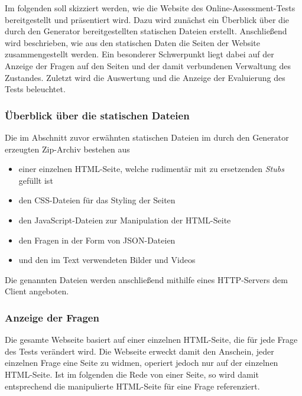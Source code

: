 \label{Jena}

Im folgenden soll skizziert werden, wie die Website des Online-Assessment-Tests bereitgestellt und präsentiert wird. Dazu wird zunächst ein Überblick über die durch den Generator bereitgestellten statischen Dateien erstellt. Anschließend wird beschrieben, wie aus den statischen Daten die Seiten der Website zusammengestellt werden. Ein besonderer Schwerpunkt liegt dabei auf der Anzeige der Fragen auf den Seiten und der damit verbundenen Verwaltung des Zustandes. Zuletzt wird die Auswertung und die Anzeige der Evaluierung des Tests beleuchtet.

\subsubsection{Überblick über die statischen Dateien}

Die im Abschnitt zuvor erwähnten statischen Dateien im durch den Generator erzeugten Zip-Archiv bestehen aus

\begin{itemize}
\item einer einzelnen HTML-Seite, welche rudimentär mit zu ersetzenden \textit{Stubs} gefüllt ist

\item den CSS-Dateien für das Styling der Seiten

\item den JavaScript-Dateien zur Manipulation der HTML-Seite 

\item den Fragen in der Form von JSON-Dateien

\item und den im Text verwendeten Bilder und Videos
\end{itemize}

Die genannten Dateien werden anschließend mithilfe eines HTTP-Servers dem Client angeboten. 

\subsubsection{Anzeige der Fragen}

Die gesamte Webseite basiert auf einer einzelnen HTML-Seite, die für jede Frage des Tests verändert wird. Die Webseite erweckt damit den Anschein, jeder einzelnen Frage eine Seite zu widmen, operiert jedoch nur auf der einzelnen HTML-Seite. Ist im folgenden die Rede von einer Seite, so wird damit entsprechend die manipulierte HTML-Seite für eine Frage referenziert.


